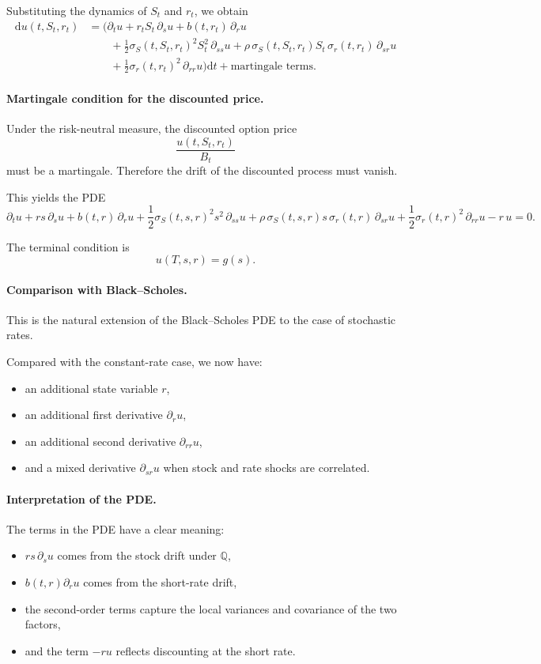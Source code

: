 \documentclass[11pt]{article}
\newcommand{\Qbb}{\mathbb{Q}}
\theoremstyle{plain}
\theoremstyle{definition}
\theoremstyle{remark}
\begin{document}
Substituting the dynamics of \(S_t\) and \(r_t\), we obtain
\begin{align*}
\mathrm{d}u(t,S_t,r_t)
&=
\Big(
\partial_t u
+
r_tS_t\,\partial_s u
+
b(t,r_t)\,\partial_r u
\\
&\qquad
+
\frac12 \sigma_S(t,S_t,r_t)^2 S_t^2\,\partial_{ss}u
+
\rho\,\sigma_S(t,S_t,r_t)S_t\,\sigma_r(t,r_t)\,\partial_{sr}u
\\
&\qquad
+
\frac12 \sigma_r(t,r_t)^2\,\partial_{rr}u
\Big)\mathrm{d}t
+\text{martingale terms.}
\end{align*}

\paragraph{Martingale condition for the discounted price.}
Under the risk-neutral measure, the discounted option price
\[
\frac{u(t,S_t,r_t)}{B_t}
\]
must be a martingale.
Therefore the drift of the discounted process must vanish.

This yields the PDE
\[
\boxed{
\partial_t u
+
rs\,\partial_s u
+
b(t,r)\,\partial_r u
+
\frac12 \sigma_S(t,s,r)^2 s^2\,\partial_{ss}u
+
\rho\,\sigma_S(t,s,r)s\,\sigma_r(t,r)\,\partial_{sr}u
+
\frac12 \sigma_r(t,r)^2\,\partial_{rr}u
-r\,u
=
0.
}
\]

The terminal condition is
\[
\boxed{
u(T,s,r)=g(s).
}
\]

\paragraph{Comparison with Black--Scholes.}
This is the natural extension of the Black--Scholes PDE to the case of
stochastic rates.

Compared with the constant-rate case, we now have:
\begin{itemize}[leftmargin=1.4em]
    \item an additional state variable \(r\),
    \item an additional first derivative \(\partial_r u\),
    \item an additional second derivative \(\partial_{rr}u\),
    \item and a mixed derivative \(\partial_{sr}u\) when stock and rate
    shocks are correlated.
\end{itemize}

\paragraph{Interpretation of the PDE.}
The terms in the PDE have a clear meaning:
\begin{itemize}[leftmargin=1.4em]
    \item \(rs\,\partial_s u\) comes from the stock drift under
    \(\Qbb\),
    \item \(b(t,r)\partial_r u\) comes from the short-rate drift,
    \item the second-order terms capture the local variances and
    covariance of the two factors,
    \item and the term \(-ru\) reflects discounting at the short rate.
\end{itemize}
\end{document}
